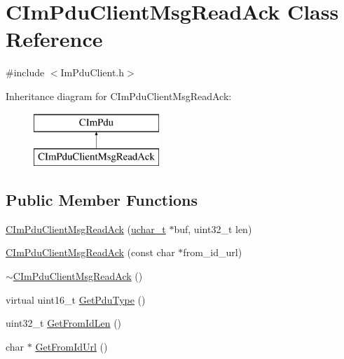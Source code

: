 \hypertarget{class_c_im_pdu_client_msg_read_ack}{}\section{C\+Im\+Pdu\+Client\+Msg\+Read\+Ack Class Reference}
\label{class_c_im_pdu_client_msg_read_ack}


{\ttfamily \#include $<$Im\+Pdu\+Client.\+h$>$}

Inheritance diagram for C\+Im\+Pdu\+Client\+Msg\+Read\+Ack\+:\begin{figure}[H]
\begin{center}
\leavevmode
\includegraphics[height=2.000000cm]{class_c_im_pdu_client_msg_read_ack}
\end{center}
\end{figure}
\subsection*{Public Member Functions}
\begin{DoxyCompactItemize}
\item 
\hyperlink{class_c_im_pdu_client_msg_read_ack_a1276bd5f2b021dadfeef33cf07271313}{C\+Im\+Pdu\+Client\+Msg\+Read\+Ack} (\hyperlink{base_2ostype_8h_a124ea0f8f4a23a0a286b5582137f0b8d}{uchar\+\_\+t} $\ast$buf, uint32\+\_\+t len)
\item 
\hyperlink{class_c_im_pdu_client_msg_read_ack_a30eb184bd5b3703655ed793a7463a61a}{C\+Im\+Pdu\+Client\+Msg\+Read\+Ack} (const char $\ast$from\+\_\+id\+\_\+url)
\item 
\hyperlink{class_c_im_pdu_client_msg_read_ack_a8f5a97b45ae906dbece27aa58747b8a2}{$\sim$\+C\+Im\+Pdu\+Client\+Msg\+Read\+Ack} ()
\item 
virtual uint16\+\_\+t \hyperlink{class_c_im_pdu_client_msg_read_ack_a8adbdd34324943f7d1713bb1df6c703d}{Get\+Pdu\+Type} ()
\item 
uint32\+\_\+t \hyperlink{class_c_im_pdu_client_msg_read_ack_a67fd78a5e127e63816e2ba0b5e0f997e}{Get\+From\+Id\+Len} ()
\item 
char $\ast$ \hyperlink{class_c_im_pdu_client_msg_read_ack_a4a21319715a284e91c93aeb54472ccb0}{Get\+From\+Id\+Url} ()
\end{DoxyCompactItemize}
